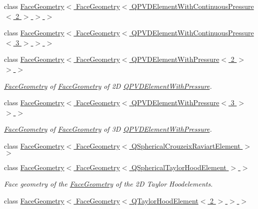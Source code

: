 \begin{DoxyCompactItemize}
class \hyperlink{classoomph_1_1FaceGeometry_3_01FaceGeometry_3_01QPVDElementWithContinuousPressure_3_012_01_4_01_4_01_4}{Face\+Geometry$<$ Face\+Geometry$<$ Q\+P\+V\+D\+Element\+With\+Continuous\+Pressure$<$ 2 $>$ $>$ $>$}
\item 
class \hyperlink{classoomph_1_1FaceGeometry_3_01FaceGeometry_3_01QPVDElementWithContinuousPressure_3_013_01_4_01_4_01_4}{Face\+Geometry$<$ Face\+Geometry$<$ Q\+P\+V\+D\+Element\+With\+Continuous\+Pressure$<$ 3 $>$ $>$ $>$}
\item 
class \hyperlink{classoomph_1_1FaceGeometry_3_01FaceGeometry_3_01QPVDElementWithPressure_3_012_01_4_01_4_01_4}{Face\+Geometry$<$ Face\+Geometry$<$ Q\+P\+V\+D\+Element\+With\+Pressure$<$ 2 $>$ $>$ $>$}
\begin{DoxyCompactList}\small\item\em \hyperlink{classoomph_1_1FaceGeometry}{Face\+Geometry} of \hyperlink{classoomph_1_1FaceGeometry}{Face\+Geometry} of 2D \hyperlink{classoomph_1_1QPVDElementWithPressure}{Q\+P\+V\+D\+Element\+With\+Pressure}. \end{DoxyCompactList}\item 
class \hyperlink{classoomph_1_1FaceGeometry_3_01FaceGeometry_3_01QPVDElementWithPressure_3_013_01_4_01_4_01_4}{Face\+Geometry$<$ Face\+Geometry$<$ Q\+P\+V\+D\+Element\+With\+Pressure$<$ 3 $>$ $>$ $>$}
\begin{DoxyCompactList}\small\item\em \hyperlink{classoomph_1_1FaceGeometry}{Face\+Geometry} of \hyperlink{classoomph_1_1FaceGeometry}{Face\+Geometry} of 3D \hyperlink{classoomph_1_1QPVDElementWithPressure}{Q\+P\+V\+D\+Element\+With\+Pressure}. \end{DoxyCompactList}\item 
class \hyperlink{classoomph_1_1FaceGeometry_3_01FaceGeometry_3_01QSphericalCrouzeixRaviartElement_01_4_01_4}{Face\+Geometry$<$ Face\+Geometry$<$ Q\+Spherical\+Crouzeix\+Raviart\+Element $>$ $>$}
\item 
class \hyperlink{classoomph_1_1FaceGeometry_3_01FaceGeometry_3_01QSphericalTaylorHoodElement_01_4_01_4}{Face\+Geometry$<$ Face\+Geometry$<$ Q\+Spherical\+Taylor\+Hood\+Element $>$ $>$}
\begin{DoxyCompactList}\small\item\em Face geometry of the \hyperlink{classoomph_1_1FaceGeometry}{Face\+Geometry} of the 2D Taylor Hoodelements. \end{DoxyCompactList}\item 
class \hyperlink{classoomph_1_1FaceGeometry_3_01FaceGeometry_3_01QTaylorHoodElement_3_012_01_4_01_4_01_4}{Face\+Geometry$<$ Face\+Geometry$<$ Q\+Taylor\+Hood\+Element$<$ 2 $>$ $>$ $>$}

\end{DoxyCompactItemize}
